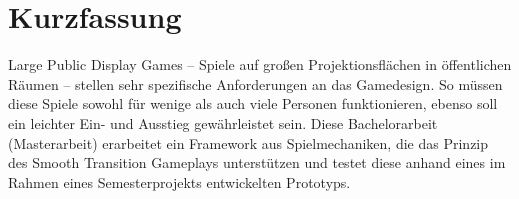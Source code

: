 \chapter{Kurzfassung}

Large Public Display Games -- Spiele auf großen Projektionsflächen in
öffentlichen Räumen -- stellen sehr spezifische Anforderungen an das Gamedesign.
So müssen diese Spiele sowohl für wenige als auch viele Personen funktionieren,
ebenso soll ein leichter Ein- und Ausstieg gewährleistet sein. Diese
Bachelorarbeit (Masterarbeit) erarbeitet ein Framework aus Spielmechaniken, die
das Prinzip des Smooth Transition Gameplays unterstützen und testet diese anhand
eines im Rahmen eines Semesterprojekts entwickelten Prototyps.
